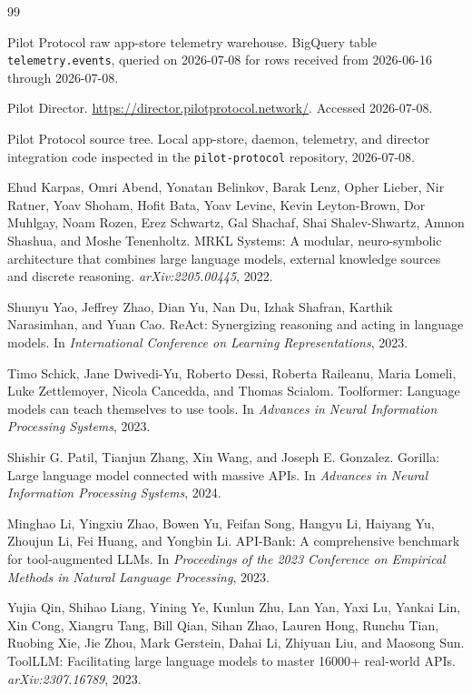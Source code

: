 \documentclass[10pt,twocolumn]{article}
\newcommand{\pilot}{Pilot Protocol}
\newcommand{\director}{Pilot Director}
\begin{document}
\begin{thebibliography}{99}

\pilot{} raw app-store telemetry warehouse.
BigQuery table \texttt{telemetry.events}, queried on 2026-07-08 for rows received from 2026-06-16 through 2026-07-08.

\director{}.
\url{https://director.pilotprotocol.network/}.
Accessed 2026-07-08.

\pilot{} source tree.
Local app-store, daemon, telemetry, and director integration code inspected in the \texttt{pilot-protocol} repository, 2026-07-08.

Ehud Karpas, Omri Abend, Yonatan Belinkov, Barak Lenz, Opher Lieber, Nir Ratner, Yoav Shoham, Hofit Bata, Yoav Levine, Kevin Leyton-Brown, Dor Muhlgay, Noam Rozen, Erez Schwartz, Gal Shachaf, Shai Shalev-Shwartz, Amnon Shashua, and Moshe Tenenholtz.
\newblock MRKL Systems: A modular, neuro-symbolic architecture that combines large language models, external knowledge sources and discrete reasoning.
\newblock \emph{arXiv:2205.00445}, 2022.

Shunyu Yao, Jeffrey Zhao, Dian Yu, Nan Du, Izhak Shafran, Karthik Narasimhan, and Yuan Cao.
\newblock ReAct: Synergizing reasoning and acting in language models.
\newblock In \emph{International Conference on Learning Representations}, 2023.

Timo Schick, Jane Dwivedi-Yu, Roberto Dessi, Roberta Raileanu, Maria Lomeli, Luke Zettlemoyer, Nicola Cancedda, and Thomas Scialom.
\newblock Toolformer: Language models can teach themselves to use tools.
\newblock In \emph{Advances in Neural Information Processing Systems}, 2023.

Shishir G. Patil, Tianjun Zhang, Xin Wang, and Joseph E. Gonzalez.
\newblock Gorilla: Large language model connected with massive APIs.
\newblock In \emph{Advances in Neural Information Processing Systems}, 2024.

Minghao Li, Yingxiu Zhao, Bowen Yu, Feifan Song, Hangyu Li, Haiyang Yu, Zhoujun Li, Fei Huang, and Yongbin Li.
\newblock API-Bank: A comprehensive benchmark for tool-augmented LLMs.
\newblock In \emph{Proceedings of the 2023 Conference on Empirical Methods in Natural Language Processing}, 2023.

Yujia Qin, Shihao Liang, Yining Ye, Kunlun Zhu, Lan Yan, Yaxi Lu, Yankai Lin, Xin Cong, Xiangru Tang, Bill Qian, Sihan Zhao, Lauren Hong, Runchu Tian, Ruobing Xie, Jie Zhou, Mark Gerstein, Dahai Li, Zhiyuan Liu, and Maosong Sun.
\newblock ToolLLM: Facilitating large language models to master 16000+ real-world APIs.
\newblock \emph{arXiv:2307.16789}, 2023.


\end{thebibliography}
\end{document}

